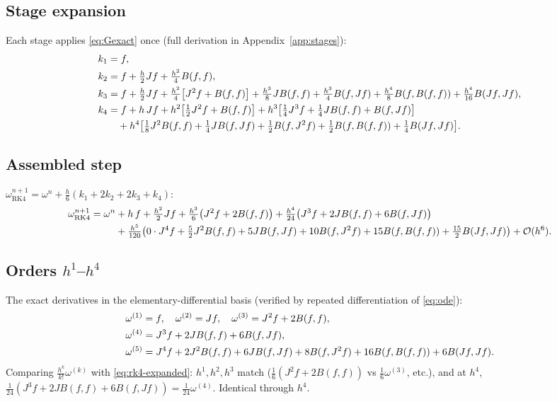 \documentclass[11pt]{article}
\newcommand{\bO}{\mathcal{O}}
\begin{document}
\subsection{Stage expansion}
Each stage applies \eqref{eq:Gexact} once (full derivation in Appendix~\ref{app:stages}):
\begin{align}
  k_1 &= f, \notag\\
  k_2 &= f + \tfrac{h}{2}Jf + \tfrac{h^2}{4}B(f,f), \notag\\
  k_3 &= f + \tfrac{h}{2}Jf + \tfrac{h^2}{4}\bigl[J^2f+B(f,f)\bigr]
         + \tfrac{h^3}{8}JB(f,f) + \tfrac{h^3}{4}B(f,Jf)
         + \tfrac{h^4}{8}B(f,B(f,f)) + \tfrac{h^4}{16}B(Jf,Jf), \notag\\
  k_4 &= f + h\,Jf + h^2\bigl[\tfrac12 J^2f+B(f,f)\bigr]
         + h^3\bigl[\tfrac14 J^3f+\tfrac14 JB(f,f)+B(f,Jf)\bigr] \notag\\
      &\quad + h^4\bigl[\tfrac18 J^2B(f,f)+\tfrac14 JB(f,Jf)+\tfrac12 B(f,J^2f)+\tfrac12 B(f,B(f,f))+\tfrac14 B(Jf,Jf)\bigr].
  \label{eq:k4}
\end{align}

\subsection{Assembled step}
$\omega^{n+1}_{\mathrm{RK4}} = \omega^n + \tfrac{h}{6}(k_1+2k_2+2k_3+k_4)$:
\begin{align}
  \omega^{n+1}_{\mathrm{RK4}} = \omega^n
  &+ h\,f
   + \tfrac{h^2}{2}Jf
   + \tfrac{h^3}{6}\bigl(J^2f + 2B(f,f)\bigr)
   + \tfrac{h^4}{24}\bigl(J^3f + 2JB(f,f) + 6B(f,Jf)\bigr)\notag\\
  &+ \tfrac{h^5}{120}\bigl(0\cdot J^4f + \tfrac{5}{2}J^2B(f,f) + 5JB(f,Jf)
       + 10B(f,J^2f) + 15B(f,B(f,f)) + \tfrac{15}{2}B(Jf,Jf)\bigr)
   +\bO(h^6).
  \label{eq:rk4-expanded}
\end{align}

\subsection{Orders $h^1$--$h^4$}
The exact derivatives in the elementary-differential basis (verified by repeated
differentiation of \eqref{eq:ode}):
\begin{align}
  \omega^{(1)}&=f, \quad
  \omega^{(2)}=Jf, \quad
  \omega^{(3)}=J^2f+2B(f,f), \notag\\
  \omega^{(4)}&=J^3f+2JB(f,f)+6B(f,Jf), \label{eq:w-elem}\\
  \omega^{(5)}&=J^4f+2J^2B(f,f)+6JB(f,Jf)+8B(f,J^2f)+16B(f,B(f,f))+6B(Jf,Jf). \notag
\end{align}
Comparing $\tfrac{h^k}{k!}\omega^{(k)}$ with \eqref{eq:rk4-expanded}: $h^1,h^2,h^3$ match
($\tfrac{1}{6}(J^2f+2B(f,f))$ vs $\tfrac{1}{6}\omega^{(3)}$, etc.), and at $h^4$,
$\tfrac{1}{24}(J^3f+2JB(f,f)+6B(f,Jf))=\tfrac{1}{24}\omega^{(4)}$. Identical through $h^4$.
\end{document}
